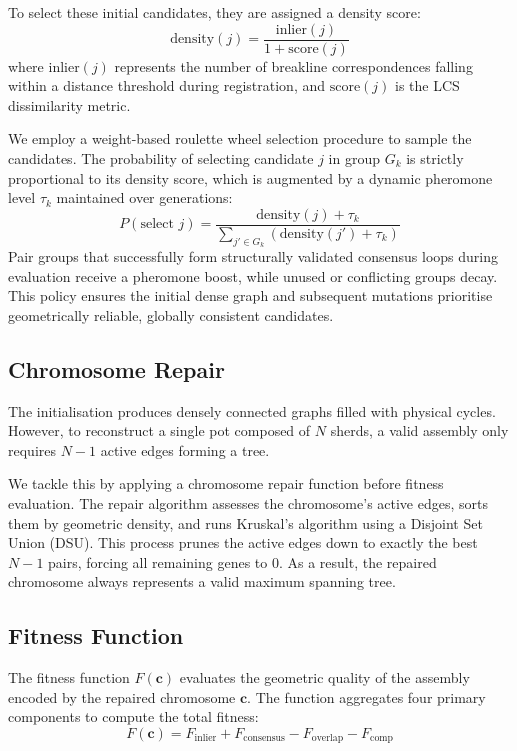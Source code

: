 \documentclass[conference]{IEEEtran}
\begin{document}
To select these initial candidates, they are assigned a density score:
\begin{equation}
\text{density}(j) = \frac{\text{inlier}(j)}{1 + \text{score}(j)}
\end{equation}
where $\text{inlier}(j)$ represents the number of breakline correspondences falling within a distance threshold during registration, and $\text{score}(j)$ is the LCS dissimilarity metric.

We employ a weight-based roulette wheel selection procedure to sample the candidates. The probability of selecting candidate $j$ in group $G_k$ is strictly proportional to its density score, which is augmented by a dynamic pheromone level $\tau_k$ maintained over generations:
\begin{equation}
P(\text{select } j) = \frac{\text{density}(j) + \tau_k}{\sum_{j' \in G_k} (\text{density}(j') + \tau_k)}
\end{equation}
Pair groups that successfully form structurally validated consensus loops during evaluation receive a pheromone boost, while unused or conflicting groups decay. This policy ensures the initial dense graph and subsequent mutations prioritise geometrically reliable, globally consistent candidates.

\subsection{Chromosome Repair}
The initialisation produces densely connected graphs filled with physical cycles. However, to reconstruct a single pot composed of $N$ sherds, a valid assembly only requires $N-1$ active edges forming a tree.

We tackle this by applying a chromosome repair function before fitness evaluation. The repair algorithm assesses the chromosome's active edges, sorts them by geometric density, and runs Kruskal’s algorithm using a Disjoint Set Union (DSU). This process prunes the active edges down to exactly the best $N-1$ pairs, forcing all remaining genes to $0$. As a result, the repaired chromosome always represents a valid maximum spanning tree.

\subsection{Fitness Function}
The fitness function $F(\mathbf{c})$ evaluates the geometric quality of the assembly encoded by the repaired chromosome $\mathbf{c}$. The function aggregates four primary components to compute the total fitness:
\begin{equation}
F(\mathbf{c}) = F_{\text{inlier}} + F_{\text{consensus}} - F_{\text{overlap}} - F_{\text{comp}}
\end{equation}
\end{document}
